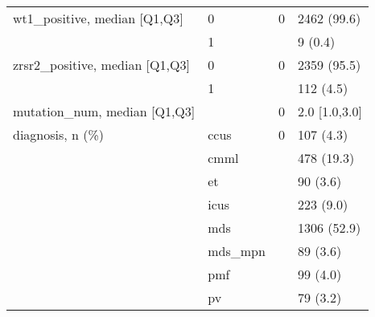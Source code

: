 \begin{tabular}{llll}
wt1\_positive, median [Q1,Q3] & 0 &      0 &       2462 (99.6) \\
                 & 1 &        &           9 (0.4) \\
zrsr2\_positive, median [Q1,Q3] & 0 &      0 &       2359 (95.5) \\
                 & 1 &        &         112 (4.5) \\
mutation\_num, median [Q1,Q3] &    &      0 &     2.0 [1.0,3.0] \\
diagnosis, n (\%) & ccus &      0 &         107 (4.3) \\
                 & cmml &        &        478 (19.3) \\
                 & et &        &          90 (3.6) \\
                 & icus &        &         223 (9.0) \\
                 & mds &        &       1306 (52.9) \\
                 & mds\_mpn &        &          89 (3.6) \\
                 & pmf &        &          99 (4.0) \\
                 & pv &        &          79 (3.2) \\
\bottomrule
\end{tabular}
